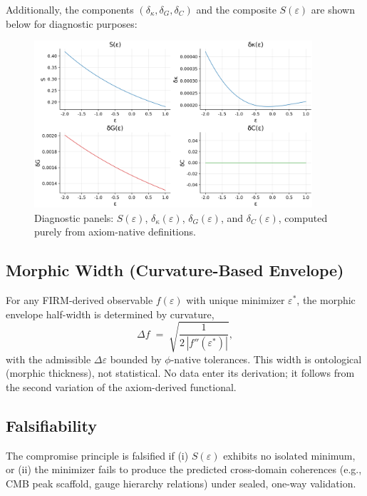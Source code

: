 \noindent Additionally, the components $(\delta_\kappa,\delta_G,\delta_C)$ and
the composite $S(\varepsilon)$ are shown below for diagnostic purposes:
\begin{figure}[H]
  \centering
  \includegraphics[width=0.92\textwidth]{figures/epsilon_components_scan.png}
  \caption{Diagnostic panels: $S(\varepsilon)$, $\delta_\kappa(\varepsilon)$,
  $\delta_G(\varepsilon)$, and $\delta_C(\varepsilon)$, computed purely from
  axiom-native definitions.}
\end{figure}

\subsection{Morphic Width (Curvature-Based Envelope)}
For any FIRM-derived observable $f(\varepsilon)$ with unique minimizer $\varepsilon^*$,
the morphic envelope half-width is determined by curvature,
\begin{equation}
\Delta f \;=\; \sqrt{\frac{1}{2\,|f''(\varepsilon^*)|}},
\end{equation}
with the admissible $\Delta\varepsilon$ bounded by $\phi$-native tolerances.
This width is ontological (morphic thickness), not statistical. No data enter
its derivation; it follows from the second variation of the axiom-derived
functional.

\subsection{Falsifiability}
The compromise principle is falsified if (i) $S(\varepsilon)$ exhibits no isolated
minimum, or (ii) the minimizer fails to produce the predicted cross-domain
coherences (e.g., CMB peak scaffold, gauge hierarchy relations) under sealed,
one-way validation.


